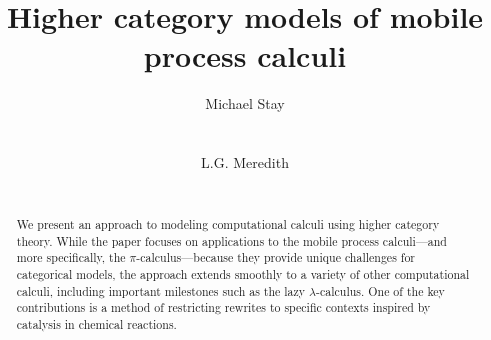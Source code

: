 \documentclass[]{acm_proc_article-sp}
\numberwithin{equation}{subsection}
\newcommand{\pic}{$\pi$-calculus}
\newcommand{\papertitle}{Higher category models of mobile process calculi}
\begin{document}
\lstset{language=}

\setlength{\topmargin}{0in}
\setlength{\textheight}{8.5in}
\setlength{\parskip}{6pt}

\title{\papertitle}

\author{
\alignauthor
Michael Stay\\
  \\
   \\
\alignauthor 
L.G. Meredith\\
  \\
}










\begin{abstract}
\normalsize{ 

  We present an approach to modeling computational calculi using
  higher category theory.  While the paper focuses on applications to
  the mobile process calculi---and more specifically, the 
  {\pic}---because they provide unique challenges for categorical 
  models, the approach extends smoothly to a variety of other computational
  calculi, including important milestones such as the lazy 
  $\lambda$-calculus. One of the key contributions is a method of
  restricting rewrites to specific contexts inspired by catalysis in
  chemical reactions.

}

\end{abstract}
\end{document}
